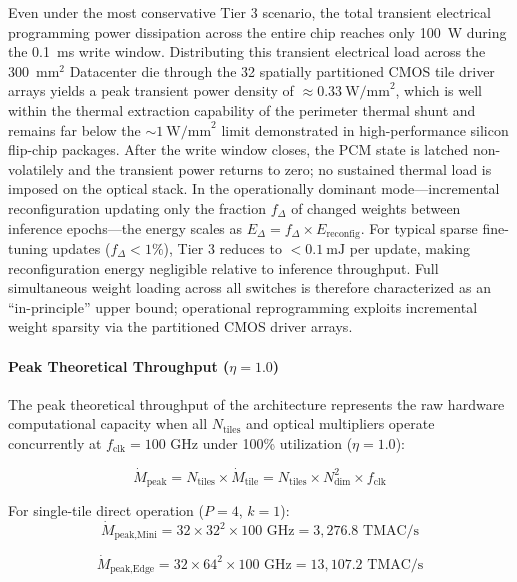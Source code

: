 \documentclass[journal]{IEEEtran}
\begin{document}
Even under the most conservative Tier 3 scenario, the total transient electrical programming power dissipation across the entire chip reaches only 100~W during the 0.1~ms write window. Distributing this transient electrical load across the 300~$\text{mm}^{2}$ Datacenter die through the 32 spatially partitioned CMOS tile driver arrays yields a peak transient power density of $\approx 0.33~\text{W/mm}^{2}$, which is well within the thermal extraction capability of the perimeter thermal shunt and remains far below the $\sim 1~\text{W/mm}^{2}$ limit demonstrated in high-performance silicon flip-chip packages. After the write window closes, the PCM state is latched non-volatilely and the transient power returns to zero; no sustained thermal load is imposed on the optical stack. In the operationally dominant mode---incremental reconfiguration updating only the fraction $f_{\Delta}$ of changed weights between inference epochs---the energy scales as $E_{\Delta} = f_{\Delta} \times E_{\text{reconfig}}$. For typical sparse fine-tuning updates ($f_{\Delta} < 1\%$), Tier 3 reduces to $< 0.1~\text{mJ}$ per update, making reconfiguration energy negligible relative to inference throughput. Full simultaneous weight loading across all switches is therefore characterized as an ``in-principle'' upper bound; operational reprogramming exploits incremental weight sparsity via the partitioned CMOS driver arrays. 

\paragraph{\textbf{Peak Theoretical Throughput ($\eta = 1.0$)}}
The peak theoretical throughput of the architecture represents the raw hardware computational capacity when all $N_{\text{tiles}}$ and optical multipliers operate concurrently at $f_{\text{clk}} = 100\text{ GHz}$ under 100\% utilization ($\eta = 1.0$):

\begin{equation}
\dot{M}_{\text{peak}} = N_{\text{tiles}} \times \dot{M}_{\text{tile}} = N_{\text{tiles}} \times N_{\text{dim}}^2 \times f_{\text{clk}}
\end{equation}

For single-tile direct operation ($P=4$, $k=1$):
\begin{equation}
\dot{M}_{\text{peak,Mini}} = 32 \times 32^2 \times 100\text{ GHz} = 3,276.8\text{ TMAC/s}
\end{equation}

\begin{equation}
\dot{M}_{\text{peak,Edge}} = 32 \times 64^2 \times 100\text{ GHz} = 13,107.2\text{ TMAC/s}
\end{equation}
\end{document}
